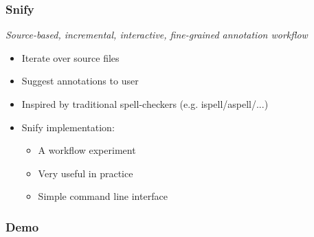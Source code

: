 \documentclass[aspectratio=169]{beamer}
\begin{document}
\begin{frame}
    \frametitle{Snify}
    {\centering\it\large Source-based, incremental, interactive, fine-grained annotation workflow\par\vspace{1.5em}}
    \begin{itemize}
        \item Iterate over source files
        \item Suggest annotations to user
        \item Inspired by traditional spell-checkers (e.g. ispell/aspell/...)
        \item Snify implementation:
            \begin{itemize}
                \item A workflow experiment
                \item Very useful in practice
                \item Simple command line interface
            \end{itemize}
    \end{itemize}
\end{frame}

\begin{frame}
    \frametitle{Demo}
\end{frame}
\end{document}
